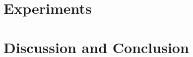 \documentclass{article}
\begin{document}
\section{Experiments}\label{sec:experiments}


\section{Discussion and Conclusion}






\clearpage
\appendix



\end{document}

